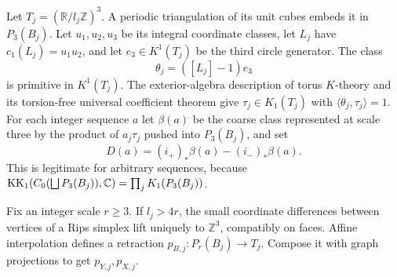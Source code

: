\documentclass[11pt]{article}
\theoremstyle{remark}\newtheorem{remark}[theorem]{Remark}
\newcommand{\Z}{\mathbb Z}\newcommand{\Q}{\mathbb Q}\newcommand{\R}{\mathbb R}
\begin{document}
Let $T_j=(\R/l_j\Z)^3$. A periodic triangulation of its unit cubes embeds
it in $P_3(B_j)$. Let $u_1,u_2,u_3$ be its integral coordinate classes, let
$L_j$ have $c_1(L_j)=u_1u_2$, and let $e_3\in K^1(T_j)$ be the third circle
generator. The class
\[
 \theta_j=([L_j]-1)e_3
\]
is primitive in $K^1(T_j)$. The exterior-algebra description of torus
$K$-theory and its torsion-free universal coefficient theorem give
$\tau_j\in K_1(T_j)$ with $\langle\theta_j,\tau_j\rangle=1$.
For each integer sequence $a$ let $\beta(a)$ be the coarse class represented
at scale three by the product of $a_j\tau_j$ pushed into $P_3(B_j)$, and set
\[
 D(a)=(i_+)_*\beta(a)-(i_-)_*\beta(a).
\]
This is legitimate for arbitrary sequences, because
$\operatorname{KK}_1(C_0(\bigsqcup P_3(B_j)),\mathbb C)=\prod_j K_1(P_3(B_j))$.

Fix an integer scale $r\geq3$. If $l_j>4r$, the small coordinate differences
between vertices of a Rips simplex lift uniquely to $\Z^3$, compatibly on
faces. Affine interpolation defines a retraction
$p_{B,j}:P_r(B_j)\to T_j$. Compose it with graph projections to get
$p_{Y,j},p_{X,j}$.
\end{document}
